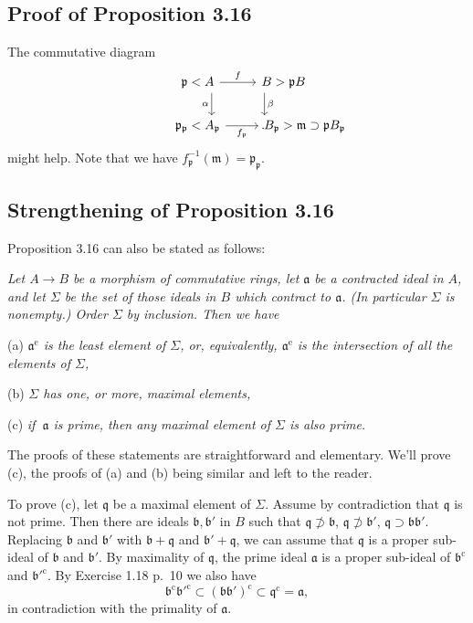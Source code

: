 \documentclass[parskip=half,fontsize=12pt]{scrartcl}%
\newcommand{\oo}{\operatorname}\newcommand{\ooo}{\operatorname*}
\newcommand{\mf}{\mathfrak}
\newcommand{\aaa}{\mf a}
\newcommand{\bbb}{\mf b}
\newcommand{\ppp}{\mf p}
\begin{document}
\subsection{Proof of Proposition 3.16}

The commutative diagram
$$
\begin{tikzcd}
\kern-22pt\ppp<A\ar[d,"\alpha"']\ar[r,"f"]&B>\ppp B\ar[d,"\beta"]\kern-30pt\\ 
\kern-22pt\ppp_\ppp<A_\ppp\ar[r,"f_\ppp"']&B_\ppp>\mf m\supset\ppp B_\ppp\kern-66pt.
\end{tikzcd}
$$ 
might help. Note that we have $f_\ppp^{-1}(\mf m)=\ppp_\ppp$.


\subsection{Strengthening of Proposition 3.16}\label{43}

Proposition 3.16 can also be stated as follows:

\emph{Let $A\to B$ be a morphism of commutative rings, let $\aaa$ be a contracted ideal in $A$, and let $\Sigma$ be the set of those ideals in $B$ which contract to $\aaa$. (In particular $\Sigma$ is nonempty.) Order $\Sigma$ by inclusion. Then we have}

(a) \emph{$\aaa^{\oo e}$ is the least element of $\Sigma$, or, equivalently, $\aaa^{\oo e}$ is the intersection of all the elements of $\Sigma$,}

(b) \emph{$\Sigma$ has one, or more, maximal elements,}

(c) \emph{if $\ \aaa$ is prime, then any maximal element of $\Sigma$ is also prime.}

The proofs of these statements are straightforward and elementary. We'll prove (c), the proofs of (a) and (b) being similar and left to the reader.

To prove (c), let $\mf q$ be a maximal element of $\Sigma$. Assume by contradiction that $\mf q$ is not prime. Then there are ideals $\mf{b,b}'$ in $B$ such that $\mf q\not\supset\mf b$, $\mf q\not\supset\mf b'$, $\mf q\supset\mf{bb}'$. Replacing $\mf b$ and $\mf b'$ with $\mf b+\mf q$ and $\mf b'+\mf q$, we can assume that $\mf q$ is a proper sub-ideal of $\bbb$ and $\bbb'$. By maximality of $\mf q$, the prime ideal $\aaa$ is a proper sub-ideal of $\bbb^{\oo c}$ and $\bbb'^{\oo c}$. By Exercise 1.18 p.~10 we also have 
$$
\bbb^{\oo c}\bbb'^{\oo c}\subset(\mf{bb}')^{\oo c}\subset\mf q^{\oo c}=\aaa,
$$ 
in contradiction with the primality of $\aaa$.
\end{document}

